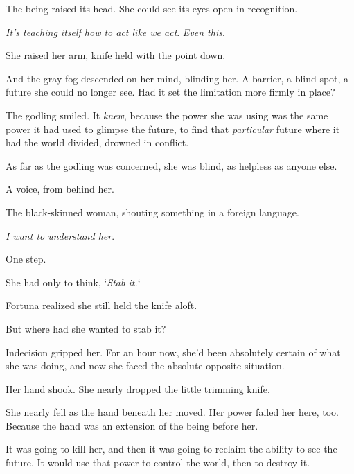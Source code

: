 The being raised its head.  She could see its eyes open in recognition.



\emph{It's teaching itself how to act like we act}.  \emph{Even this}.



She raised her arm, knife held with the point down.



And the gray fog descended on her mind, blinding her.  A barrier, a blind spot, a future she could no longer see.  Had it set the limitation more firmly in place?



The godling smiled.  It \emph{knew}, because the power she was using was the same power it had used to glimpse the future, to find that \emph{particular }future where it had the world divided, drowned in conflict.



As far as the godling was concerned, she was blind, as helpless as anyone else.



A voice, from behind her.



The black-skinned woman, shouting something in a foreign language.



\emph{I want to understand her}.



One step.



She had only to think, `\emph{Stab it.}`



Fortuna realized she still held the knife aloft.



But where had she wanted to stab it?



Indecision gripped her.  For an hour now, she'd been absolutely certain of what she was doing, and now she faced the absolute opposite situation.



Her hand shook.  She nearly dropped the little trimming knife.



She nearly fell as the hand beneath her moved.  Her power failed her here, too.  Because the hand was an extension of the being before her.



It was going to kill her, and then it was going to reclaim the ability to see the future.  It would use that power to control the world, then to destroy it.



